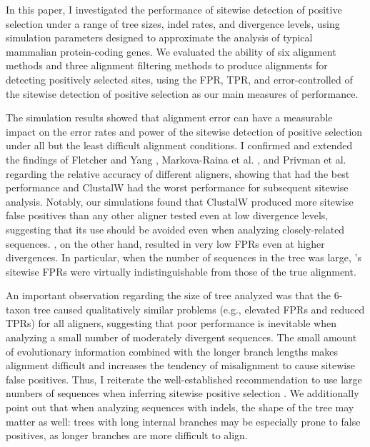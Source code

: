 In this paper, I investigated the performance of sitewise detection
of positive selection under a range of tree sizes, indel rates, and
divergence levels, using simulation parameters designed to approximate
the analysis of typical mammalian protein-coding genes. We
evaluated the ability of six alignment methods and three alignment
filtering methods to produce alignments for detecting positively
selected sites, using the FPR, TPR, and error-controlled \tpr of the
sitewise detection of positive selection as our main measures of
performance.

The simulation results showed that alignment error can have a
measurable impact on the error rates and power of the sitewise
detection of positive selection under all but the least difficult
alignment conditions. I confirmed and extended the findings of
Fletcher and Yang \citeyearpar{Fletcher2010Effect}, Markova-Raina et
al. \citeyearpar{Markova-Raina2011High}, and Privman et
al. \citeyearpar{Privman2011Improving} regarding the relative accuracy
of different aligners, showing that \prankc had the best performance
and ClustalW had the worst performance for subsequent sitewise
analysis. Notably, our simulations found that ClustalW produced more
sitewise false positives than any other aligner tested even at low
divergence levels, suggesting that its use should be avoided even when
analyzing closely-related sequences. \prankc, on the other hand,
resulted in very low FPRs even at higher divergences. In particular, when the
number of sequences in the tree was large, \prankc{}'s sitewise FPRs
were virtually indistinguishable from those of the true alignment.

An important observation regarding the size of tree analyzed was that
the 6-taxon tree caused qualitatively similar problems (e.g., elevated
FPRs and reduced TPRs) for all aligners, suggesting that poor
performance is inevitable when analyzing a small number of moderately
divergent sequences. The small amount of evolutionary information
combined with the longer branch lengths makes alignment difficult and
increases the tendency of misalignment to cause sitewise false
positives. Thus, I reiterate the well-established recommendation to
use large numbers of sequences when inferring sitewise positive
selection \citep{Anisimova2001Accuracy,Anisimova2002Accuracy}. We
additionally point out that when analyzing sequences with indels, the
shape of the tree may matter as well: trees with long internal
branches may be especially prone to false positives, as longer
branches are more difficult to align.

